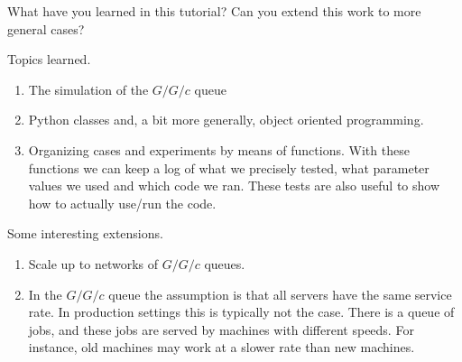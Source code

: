 \begin{exercise}
  What have you learned in this tutorial?
 Can you extend this work to more general cases?
\begin{solution}
    Topics learned.
    \begin{enumerate}
    \item The simulation of the $G/G/c$ queue
    \item Python classes and, a bit more generally, object oriented programming.
    \item Organizing cases and experiments by means of  functions. With these functions we can keep a log of what we precisely tested, what parameter values we used and which code we ran. These tests are also useful to show how to actually use/run the code.
    \end{enumerate}

Some  interesting extensions.
    \begin{enumerate}
    \item   Scale up to networks of $G/G/c$ queues.
    \item In the $G/G/c$ queue the assumption is that all servers have the same service rate.
      In production settings this is typically not the case.
      There is a queue of jobs, and these jobs are served by machines with different speeds.
      For instance, old machines may work at a slower rate than new machines.
    \end{enumerate}
  \end{solution}
\end{exercise}
